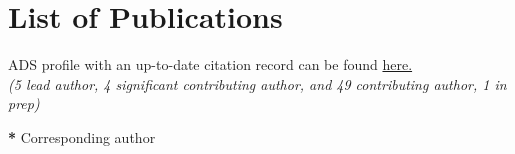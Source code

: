 \documentclass[10pt,a4paper,roman,]{moderncv} %
\begin{document}
\clearpage
\section{List of Publications}
\begin{center}
ADS profile with an up-to-date citation record can be found \href{https://ui.adsabs.harvard.edu/search/p_=0&q=orcid\%3A0000-0002-5665-7912&sort=date\%20desc\%2C\%20bibcode\%20desc}{here.} \\
    \textit{(5 lead author, 4 significant contributing author, and 49 contributing author, 1 in prep)\\}
    
    

\end{center}

 \begin{etaremune}[leftmargin=40pt,labelsep=10pt]

 
\end{etaremune}
\hspace*{\fill}\textbf{*} Corresponding author
 \begin{etaremune}[leftmargin=40pt,labelsep=10pt]
 
\end{etaremune} 

% 

\end{document}
